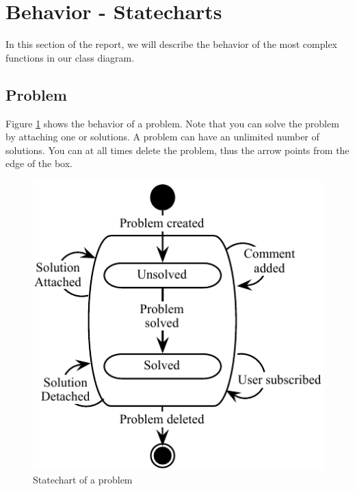 \section{Behavior - Statecharts}
In this section of the report, we will describe the behavior of the most complex functions in our class diagram.

\subsection{Problem}
Figure \ref{fig:Klasse_diagram_problem} shows the behavior of a problem. Note that you can solve the problem by attaching one or solutions. A problem can have an unlimited number of solutions. You can at all times delete the problem, thus the arrow points from the edge of the box.
\begin{figure}[H]
\begin{center}
\includegraphics[width=1\textwidth]{input/problem_domain_analysis/Klassediagram_problem.pdf}
\caption{Statechart of a problem}
\label{fig:Klasse_diagram_problem}
\end{center}
\end{figure}

